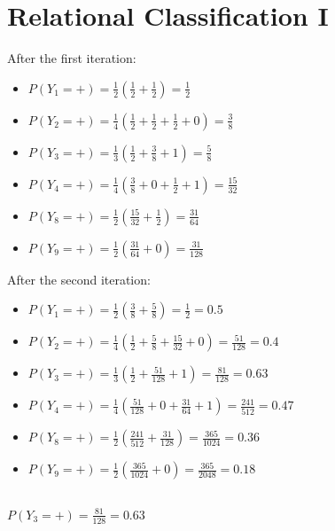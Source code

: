 \documentclass[a4paper,11pt]{article}
\begin{document}

\section{Relational Classification I}
After the first iteration:
\begin{itemize}
    \item $P(Y_1 = +) = \frac{1}{2} (\frac{1}{2} + \frac{1}{2}) = \frac{1}{2}$
    \item $P(Y_2 = +) = \frac{1}{4} (\frac{1}{2} + \frac{1}{2} + \frac{1}{2} + 0) = \frac{3}{8}$
    \item $P(Y_3 = +) = \frac{1}{3} (\frac{1}{2} + \frac{3}{8} + 1) = \frac{5}{8}$
    \item $P(Y_4 = +) = \frac{1}{4} (\frac{3}{8} + 0 + \frac{1}{2} + 1) = \frac{15}{32}$
    \item $P(Y_8 = +) = \frac{1}{2} (\frac{15}{32} + \frac{1}{2}) = \frac{31}{64}$
    \item $P(Y_9 = +) = \frac{1}{2} (\frac{31}{64} + 0) = \frac{31}{128}$
\end{itemize}
After the second iteration:
\begin{itemize}
    \item $P(Y_1 = +) = \frac{1}{2} (\frac{3}{8} + \frac{5}{8}) = \frac{1}{2} = 0.5$
    \item $P(Y_2 = +) = \frac{1}{4} (\frac{1}{2} + \frac{5}{8} + \frac{15}{32} + 0) = \frac{51}{128} = 0.4$
    \item $P(Y_3 = +) = \frac{1}{3} (\frac{1}{2} + \frac{51}{128} + 1) = \frac{81}{128} = 0.63$
    \item $P(Y_4 = +) = \frac{1}{4} (\frac{51}{128} + 0 + \frac{31}{64} + 1) = \frac{241}{512} = 0.47$
    \item $P(Y_8 = +) = \frac{1}{2} (\frac{241}{512} + \frac{31}{128}) = \frac{365}{1024} = 0.36$
    \item $P(Y_9 = +) = \frac{1}{2} (\frac{365}{1024} + 0) = \frac{365}{2048} = 0.18$
\end{itemize}

\subsection{}
$P(Y_3 = +) = \frac{81}{128} = 0.63$
\end{document}

